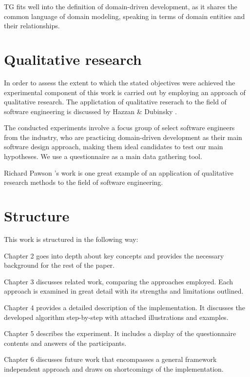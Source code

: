 TG fits well into the definition of domain-driven development, as it shares the common language of domain modeling, speaking in terms of domain entities and their relationships.

\section {Qualitative research}
In order to assess the extent to which the stated objectives were achieved the experimental component of this work is carried out by employing an approach of qualitative research.
The applictation of qualitative reserach to the field of software engineering is discussed by Hazzan \& Dubinsky \cite{hazzan}.

\n

The conducted experiments involve a focus group of select software engineers from the industry, who are practicing domain-driven development as their main software design approach, making them ideal candidates to test our main hypotheses.
We use a questionnaire as a main data gathering tool.

\n

Richard Pawson \cite{pawson}'s work is one great example of an application of qualitative research methods to the field of software engineering.

\section{Structure}

This work is structured in the following way: 

\n

\noindent Chapter 2 goes into depth about key concepts and provides the necessary background for the rest of the paper.

\n

\noindent Chapter 3 discusses related work, comparing the approaches employed. Each approach is examined in great detail with its strengths and limitations outlined.

\n

\noindent Chapter 4 provides a detailed description of the implementation. It discusses the developed algorithm step-by-step with attached illustrations and examples.

\n

\noindent Chapter 5 describes the experiment. It includes a display of the questionnaire contents and answers of the participants.

\n

\noindent Chapter 6 discusses future work that encompasses a general framework independent approach and draws on shortcomings of the implementation.
